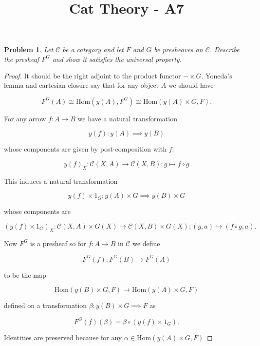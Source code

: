 \documentclass[11pt]{amsart}
\title{Cat Theory - A7}
\theoremstyle{plain}
\newtheorem{prob}[thm]{Problem}
\theoremstyle{definition}
\newcommand{\cC}{{\mathcal C}}
\newcommand{\Hom}{\text{Hom}}
\newcommand{\noi}{{\noindent}}
\begin{document}
\maketitle


    \begin{prob}
    Let $\cC$ be a category and let $F$ and $G$ be presheaves on $\cC$. Describe the presheaf $F^G$ and show it satisfies the universal property. 
    \end{prob}
    \begin{proof}
    It should be the right adjoint to the product functor $- \times G$. Yoneda's lemma and cartesian closure say that for any object $A$ we should have
    
    \[ F^G (A) \cong \Hom (y(A), F^G) \cong \Hom(y(A) \times G , F) .\]
    
    \noi For any arrow $f : A \to B$ we have a natural transformation 
    
    \[ y(f) : y(A) \implies y(B) \]
    
    \noi whose components are given by post-composition with $f$:
    
    \[ y(f)_X : \cC(X,A) \to \cC(X,B) ; g \mapsto f \circ g \]
    
    \noi This induces a natural transformation 
    
    \[ y(f) \times 1_G : y(A) \times G \implies y(B) \times G \]
    
    \noi whose components are 
    
    \[ (y(f) \times 1_G)_X : \cC(X,A) \times G(X) \to \cC(X,B) \times G(X) ; (g, a) \mapsto (f \circ g, a). \]
    
    \noi Now $F^G$ is a presheaf so for $f : A \to B$ in $\cC$ we define 

    \[ F^G(f) : F^G(B) \to F^G(A)\]
    
    \noi to be the map 

    \[ \Hom(y(B) \times G , F) \to \Hom(y(A) \times G , F)  \]

    \noi defined on a transformation $\beta : y(B) \times G \implies F$ as 

    \[ F^G(f)(\beta) = \beta \circ (y(f) \times 1_G).  \]



    \noi Identities are preserved because for any $\alpha \in \Hom(y(A) \times G, F)$  


\end{proof}
\end{document}
